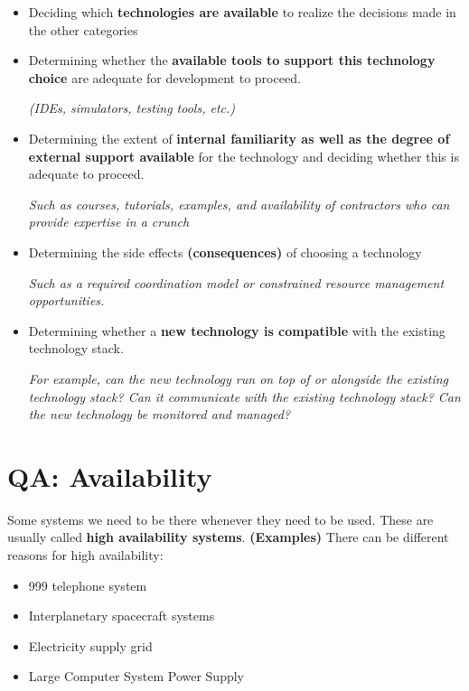 \documentclass[a4paper]{article}
\begin{document}
\begin{itemize}
\item Deciding which \textbf{technologies are available} to realize the decisions made in the other categories

\item Determining whether the \textbf{available tools to support this technology choice} are adequate for development to proceed.

\textit{(IDEs, simulators, testing tools, etc.)}

\item Determining the extent of \textbf{internal familiarity as well as the degree of external support available} for the technology and deciding whether this is adequate to proceed.

\textit{Such as courses, tutorials, examples, and availability of contractors who can provide expertise in a crunch}

\item Determining the side effects \textbf{(consequences)} of choosing a technology

\textit{Such as a required coordination model or constrained resource management opportunities.}

\item Determining whether a \textbf{new technology is compatible} with the existing technology stack. 

\textit{For example, can the new technology run on top of or alongside the existing technology stack? Can it communicate with the existing technology stack? Can the new technology be monitored and managed?}
\end{itemize}
\newpage
\section{QA: Availability}
Some systems we need to	be there whenever they need to be used.	These are usually called \textbf{high availability systems}.	
\textbf{(Examples)} There can be different reasons for high availability:	
\begin{itemize}
\item{999 telephone system}
\item{Interplanetary spacecraft systems}
\item{Electricity supply grid}
\item{Large Computer System Power Supply}\\\\
\end{itemize}
\end{document}
